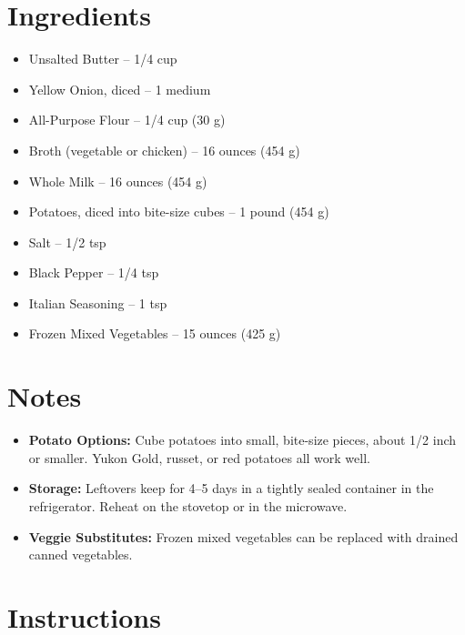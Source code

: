 




\section*{Ingredients}

\begin{itemize}
      \item Unsalted Butter – 1/4 cup
      \item[\cut] Yellow Onion, diced – 1 medium
      \item[\measure] All-Purpose Flour – 1/4 cup (30 g)
      \item[\measure] Broth (vegetable or chicken) – 16 ounces (454 g)
      \item[\measure] Whole Milk – 16 ounces (454 g)
      \item[\cut] Potatoes, diced into bite-size cubes – 1 pound (454 g)
      \item[\measure] Salt – 1/2 tsp
      \item[\measure] Black Pepper – 1/4 tsp
      \item[\measure] Italian Seasoning – 1 tsp
      \item Frozen Mixed Vegetables – 15 ounces (425 g)
\end{itemize}

\section*{Notes}

\begin{itemize}
      \item \textbf{Potato Options:} Cube potatoes into small, bite-size pieces, about 1/2 inch or smaller. Yukon Gold, russet, or red potatoes all work well.
      \item \textbf{Storage:} Leftovers keep for 4--5 days in a tightly sealed container in the refrigerator. Reheat on the stovetop or in the microwave.
      \item \textbf{Veggie Substitutes:} Frozen mixed vegetables can be replaced with drained canned vegetables.
\end{itemize}

\newpage
{}
\section*{Instructions}

